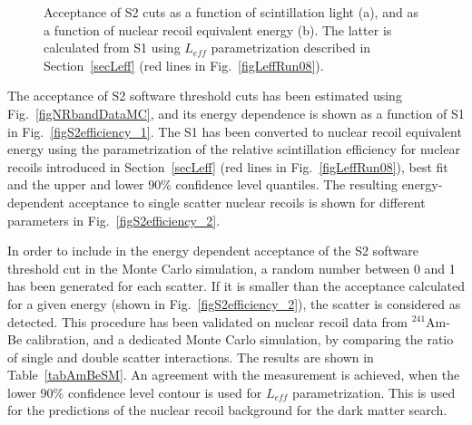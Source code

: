 \begin{figure}[!b]
\centering
{}
\caption[Acceptance of S2 software threshold cuts as a function of deposited energy]{Acceptance of S2 cuts as a function of scintillation light (a), and as a function of nuclear recoil equivalent energy (b). The latter is calculated from S1 using $L_{eff}$ parametrization described in Section~\ref{secLeff} (red lines in Fig.~\ref{figLeffRun08}). }
\label{figS2efficiency}
\end{figure}

The acceptance of S2 software threshold cuts has been estimated using Fig.~\ref{figNRbandDataMC}, and its energy dependence is shown as a function of S1 in Fig.~\ref{figS2efficiency_1}. The S1 has been converted to nuclear recoil equivalent energy using the parametrization of the relative scintillation efficiency for nuclear recoils introduced in Section~\ref{secLeff} (red lines in Fig.~\ref{figLeffRun08}), best fit and the upper and lower 90\% confidence level quantiles. The resulting energy-dependent acceptance to single scatter nuclear recoils is shown for different parameters in Fig.~\ref{figS2efficiency_2}.

In order to include in the energy dependent acceptance of the S2 software threshold cut in the Monte Carlo simulation, a random number between 0 and 1 has been generated for each scatter. If it is smaller than the acceptance calculated for a given energy (shown in Fig.~\ref{figS2efficiency_2}), the scatter is considered as detected. This procedure has been validated on nuclear recoil data from $^{241}$Am-Be calibration, and a dedicated Monte Carlo simulation, by comparing the ratio of single and double scatter interactions. The results are shown in Table~\ref{tabAmBeSM}. An agreement with the measurement is achieved, when the lower 90\% confidence level contour is used for $L_{eff}$ parametrization. This is used for the predictions of the nuclear recoil background for the dark matter search.

